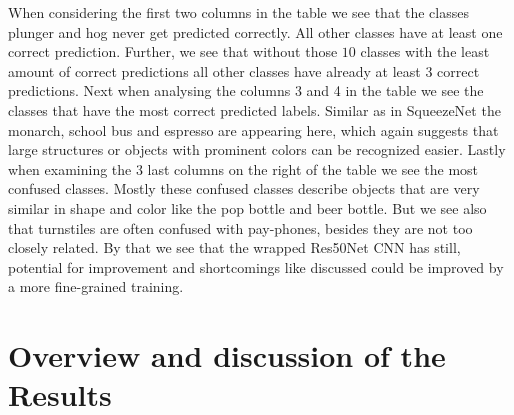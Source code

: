 \documentclass[11pt]{article}
\begin{document}
When considering the first two columns in the table we see that the classes plunger and hog never get predicted correctly. All other classes have at least one correct prediction. Further, we see that without those $10$ classes with the least amount of correct predictions all other classes have already at least 3 correct predictions. Next when analysing the columns 3 and 4 in the table we see the classes that have the most correct predicted labels. Similar as in SqueezeNet the monarch, school bus and espresso are appearing here, which again suggests that large structures or objects with prominent colors can be recognized easier. Lastly when examining the 3 last columns on the right of the table we see the most confused classes. Mostly these confused classes describe objects that are very similar in shape and color like the pop bottle and beer bottle. But we see also that turnstiles are often confused with pay-phones, besides they are not too closely related. By that we see that the wrapped Res50Net CNN has still, potential for improvement and shortcomings like discussed could be improved by a more fine-grained training.

\section{Overview and discussion of the Results}
\end{document}
